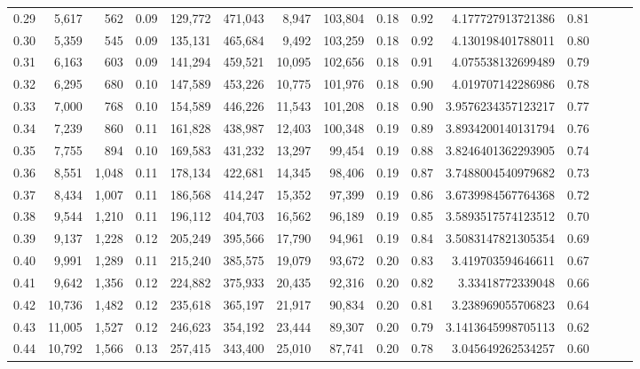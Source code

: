 \begin{tabular}{rrrrrrrrrrrrrrr}
0.29 &   5,617 &    562 &  0.09 &  129,772 &  471,043 &    8,947 &  103,804 &  0.18 &  0.92 &     4.177727913721386 &      0.81 \\
0.30 &   5,359 &    545 &  0.09 &  135,131 &  465,684 &    9,492 &  103,259 &  0.18 &  0.92 &     4.130198401788011 &      0.80 \\
0.31 &   6,163 &    603 &  0.09 &  141,294 &  459,521 &   10,095 &  102,656 &  0.18 &  0.91 &     4.075538132699489 &      0.79 \\
0.32 &   6,295 &    680 &  0.10 &  147,589 &  453,226 &   10,775 &  101,976 &  0.18 &  0.90 &     4.019707142286986 &      0.78 \\
0.33 &   7,000 &    768 &  0.10 &  154,589 &  446,226 &   11,543 &  101,208 &  0.18 &  0.90 &    3.9576234357123217 &      0.77 \\
0.34 &   7,239 &    860 &  0.11 &  161,828 &  438,987 &   12,403 &  100,348 &  0.19 &  0.89 &    3.8934200140131794 &      0.76 \\
0.35 &   7,755 &    894 &  0.10 &  169,583 &  431,232 &   13,297 &   99,454 &  0.19 &  0.88 &    3.8246401362293905 &      0.74 \\
0.36 &   8,551 &  1,048 &  0.11 &  178,134 &  422,681 &   14,345 &   98,406 &  0.19 &  0.87 &    3.7488004540979682 &      0.73 \\
0.37 &   8,434 &  1,007 &  0.11 &  186,568 &  414,247 &   15,352 &   97,399 &  0.19 &  0.86 &    3.6739984567764368 &      0.72 \\
0.38 &   9,544 &  1,210 &  0.11 &  196,112 &  404,703 &   16,562 &   96,189 &  0.19 &  0.85 &    3.5893517574123512 &      0.70 \\
0.39 &   9,137 &  1,228 &  0.12 &  205,249 &  395,566 &   17,790 &   94,961 &  0.19 &  0.84 &    3.5083147821305354 &      0.69 \\
0.40 &   9,991 &  1,289 &  0.11 &  215,240 &  385,575 &   19,079 &   93,672 &  0.20 &  0.83 &     3.419703594646611 &      0.67 \\
0.41 &   9,642 &  1,356 &  0.12 &  224,882 &  375,933 &   20,435 &   92,316 &  0.20 &  0.82 &      3.33418772339048 &      0.66 \\
0.42 &  10,736 &  1,482 &  0.12 &  235,618 &  365,197 &   21,917 &   90,834 &  0.20 &  0.81 &     3.238969055706823 &      0.64 \\
0.43 &  11,005 &  1,527 &  0.12 &  246,623 &  354,192 &   23,444 &   89,307 &  0.20 &  0.79 &    3.1413645998705113 &      0.62 \\
0.44 &  10,792 &  1,566 &  0.13 &  257,415 &  343,400 &   25,010 &   87,741 &  0.20 &  0.78 &     3.045649262534257 &      0.60 \\

\end{tabular}
